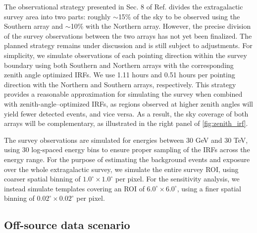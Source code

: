 The observational strategy presented in Sec. 8 of Ref. \cite{CTAConsortium:2018tzg} divides the extragalactic survey area into two parts: roughly $\sim$15\% of the sky {to be} observed using the Southern array and $\sim$10\% with the Northern array. {However, the precise division of the survey observations between the two arrays has not yet been finalized. The planned strategy remains under discussion and is still subject to adjustments.} For simplicity, we simulate observations of each pointing direction within the survey boundary using both Southern and Northern arrays with the corresponding zenith angle optimized IRFs. We use 1.11 hours and 0.51 hours per pointing direction with the Northern and Southern arrays, respectively. {This strategy provides a reasonable approximation for simulating the survey when combined with zenith-angle–optimized IRFs, as regions observed at higher zenith angles will yield fewer detected events, and vice versa.}  As a result, the sky coverage of both arrays will be complementary, as {illustrated} in the right panel of \cref{fig:zenith_irf}.

The survey observations are simulated for energies between 30 GeV and 30 TeV, using 30 log-spaced energy bins to ensure proper sampling of the IRFs across the energy range. For the purpose of estimating the background events and exposure over the whole extragalactic survey, we simulate the entire survey ROI, using coarser spatial binning of $1.0^\circ \times 1.0^\circ$ per pixel. For the sensitivity analysis, we instead simulate templates covering an ROI of $6.0^\circ\times 6.0^\circ$, using a finer spatial binning of $0.02^\circ \times 0.02^\circ$ per pixel.

\subsection{Off-source data scenario}

